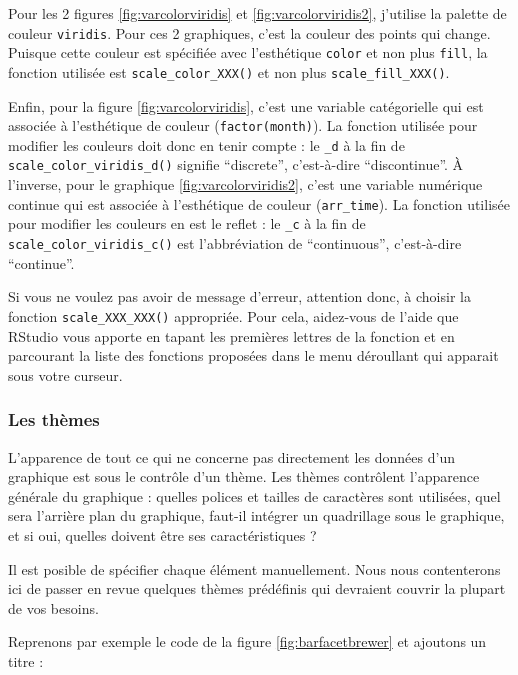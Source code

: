 \documentclass[a4paperpaper,]{article}
\theoremstyle{definition}
\theoremstyle{definition}
\theoremstyle{definition}
\theoremstyle{remark}
\begin{document}
Pour les 2 figures \ref{fig:varcolorviridis} et
\ref{fig:varcolorviridis2}, j'utilise la palette de couleur
\texttt{viridis}. Pour ces 2 graphiques, c'est la couleur des points qui
change. Puisque cette couleur est spécifiée avec l'esthétique
\texttt{color} et non plus \texttt{fill}, la fonction utilisée est
\texttt{scale\_color\_XXX()} et non plus \texttt{scale\_fill\_XXX()}.

Enfin, pour la figure \ref{fig:varcolorviridis}, c'est une variable
catégorielle qui est associée à l'esthétique de couleur
(\texttt{factor(month)}). La fonction utilisée pour modifier les
couleurs doit donc en tenir compte : le \texttt{\_d} à la fin de
\texttt{scale\_color\_viridis\_d()} signifie ``discrete'', c'est-à-dire
``discontinue''. À l'inverse, pour le graphique
\ref{fig:varcolorviridis2}, c'est une variable numérique continue qui
est associée à l'esthétique de couleur (\texttt{arr\_time}). La fonction
utilisée pour modifier les couleurs en est le reflet : le \texttt{\_c} à
la fin de \texttt{scale\_color\_viridis\_c()} est l'abbréviation de
``continuous'', c'est-à-dire ``continue''.

Si vous ne voulez pas avoir de message d'erreur, attention donc, à
choisir la fonction \texttt{scale\_XXX\_XXX()} appropriée. Pour cela,
aidez-vous de l'aide que RStudio vous apporte en tapant les premières
lettres de la fonction et en parcourant la liste des fonctions proposées
dans le menu déroullant qui apparait sous votre curseur.

\subsubsection{Les thèmes}\label{les-themes}

L'apparence de tout ce qui ne concerne pas directement les données d'un
graphique est sous le contrôle d'un thème. Les thèmes contrôlent
l'apparence générale du graphique : quelles polices et tailles de
caractères sont utilisées, quel sera l'arrière plan du graphique,
faut-il intégrer un quadrillage sous le graphique, et si oui, quelles
doivent être ses caractéristiques ?

Il est posible de spécifier chaque élément manuellement. Nous nous
contenterons ici de passer en revue quelques thèmes prédéfinis qui
devraient couvrir la plupart de vos besoins.

Reprenons par exemple le code de la figure \ref{fig:barfacetbrewer} et
ajoutons un titre :
\end{document}
